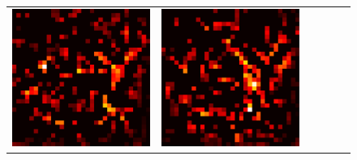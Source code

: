 \documentclass[preprint,12pt]{elsarticle}
\begin{document}
\begin{figure}[p]
\begin{tabular}{cccccc}
  \includegraphics[scale=\scale]{../visualizations/examples/cifar10/resnet18/active_saliency_map/4.png} & 
  \includegraphics[scale=\scale]{../visualizations/examples/cifar10/resnet18/inactive_saliency_map/4.png} \\
  

\end{tabular}
\end{figure}
\end{document}
